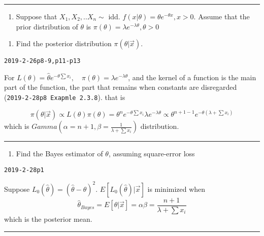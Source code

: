 \documentclass[12pt,]{article}
\providecommand{\tightlist}{%
  \setlength{\itemsep}{0pt}\setlength{\parskip}{0pt}}
\begin{document}
\begin{center}\rule{0.5\linewidth}{\linethickness}\end{center}

\begin{enumerate}
\def\labelenumi{\arabic{enumi}.}
\setcounter{enumi}{2}
\tightlist
\item
  \textcolor[rgb]{0.5,0.5,0.5}{Suppose that $X_1,X_2,..X_n\sim$ idd. $f(x|\theta)=\theta e^{-\theta x}, x>0$. Assume that the prior distribution of $\theta$ is $\pi(\theta)=\lambda e^{-\lambda\theta},\theta>0$}
\end{enumerate}

\begin{enumerate}
\def\labelenumi{\alph{enumi}.}
\tightlist
\item
  \textcolor[rgb]{0.5,0.5,0.5}{Find the posterior distribution $\pi(\theta|\vec x)$.}
\end{enumerate}

\texttt{2019-2-26p8-9,p11-p13}

For
\(L(\theta)=\hat\theta e^{-\theta\sum x_i},\quad \pi(\theta)=\lambda e^{-\lambda\theta}\),
and the kernel of a function is the main part of the function, the part
that remains when constants are disregarded
(\texttt{2019-2-28p8\ Exapmle\ 2.3.8}). that is

\[\pi(\theta|\vec x)\propto L(\theta)\pi(\theta)=\theta^n e^{-\theta\sum x_i}\lambda e^{-\lambda\theta}\propto\theta^{n+1-1}e^{-\theta(\lambda+\sum x_i)}\]
which is \(Gamma(\alpha=n+1,\beta=\frac1{\lambda+\sum x_i})\)
distribution.

\begin{center}\rule{0.5\linewidth}{\linethickness}\end{center}

\begin{enumerate}
\def\labelenumi{\alph{enumi}.}
\setcounter{enumi}{1}
\tightlist
\item
  \textcolor[rgb]{0.5,0.5,0.5}{Find the Bayes estimator of $\theta$, assuming square-error loss}
\end{enumerate}

\texttt{2019-2-28p1}

Suppose \(L_0(\hat\theta)=(\hat\theta-\theta)^2\).
\(E[L_0(\hat\theta)|\vec x]\) is minimized when
\[\hat\theta_{Bayes}=E[\theta|\vec x]=\alpha\beta=\frac{n+1}{\lambda+\sum x_i}\]
which is the posterior mean.

\begin{center}\rule{0.5\linewidth}{\linethickness}\end{center}
\end{document}
